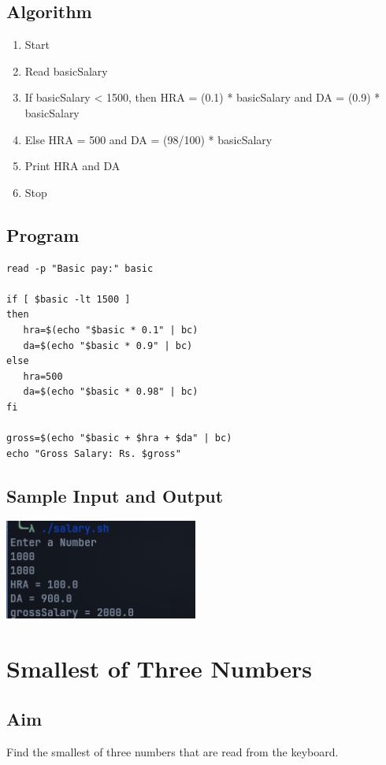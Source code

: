 \subsection{Algorithm}
\begin{enumerate}
   \item Start
   \item Read basicSalary
   \item If basicSalary < 1500, then HRA = (0.1) * basicSalary and DA = (0.9) * basicSalary
   \item Else HRA = 500 and DA = (98/100) * basicSalary
   \item Print HRA and DA
   \item Stop
\end{enumerate}

\subsection{Program}
\begin{lstlisting}[label={list:program:gross_salary}]
read -p "Basic pay:" basic

if [ $basic -lt 1500 ]
then
   hra=$(echo "$basic * 0.1" | bc)
   da=$(echo "$basic * 0.9" | bc)
else
   hra=500
   da=$(echo "$basic * 0.98" | bc)
fi

gross=$(echo "$basic + $hra + $da" | bc)
echo "Gross Salary: Rs. $gross"
\end{lstlisting}

\subsection{Sample Input and Output}
\includegraphics[]{Cycle_1//Outputs/salary.png}

\section{Smallest of Three Numbers}

\subsection{Aim}
Find the smallest of three numbers that are read from the keyboard.

